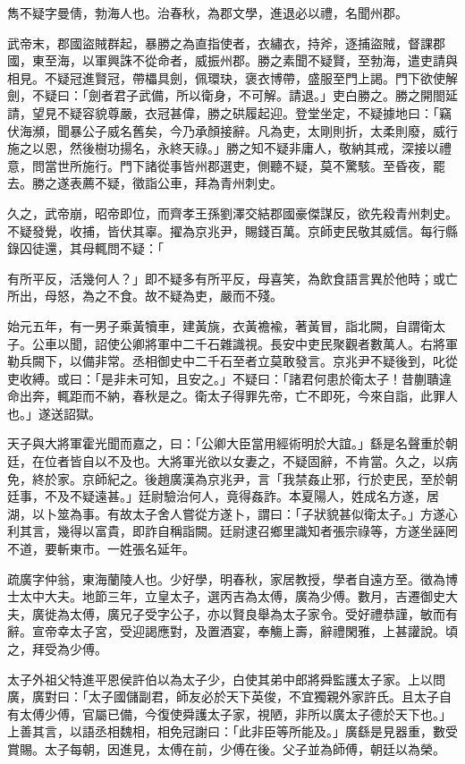 
\begin{pinyinscope}
雋不疑字曼倩，勃海人也。治春秋，為郡文學，進退必以禮，名聞州郡。

武帝末，郡國盜賊群起，暴勝之為直指使者，衣繡衣，持斧，逐捕盜賊，督課郡國，東至海，以軍興誅不從命者，威振州郡。勝之素聞不疑賢，至勃海，遣吏請與相見。不疑冠進賢冠，帶櫑具劍，佩環玦，褒衣博帶，盛服至門上謁。門下欲使解劍，不疑曰：「劍者君子武備，所以衛身，不可解。請退。」吏白勝之。勝之開閤延請，望見不疑容貌尊嚴，衣冠甚偉，勝之硔履起迎。登堂坐定，不疑據地曰：「竊伏海瀕，聞暴公子威名舊矣，今乃承顏接辭。凡為吏，太剛則折，太柔則廢，威行施之以恩，然後樹功揚名，永終天祿。」勝之知不疑非庸人，敬納其戒，深接以禮意，問當世所施行。門下諸從事皆州郡選吏，側聽不疑，莫不驚駭。至昏夜，罷去。勝之遂表薦不疑，徵詣公車，拜為青州刺史。

久之，武帝崩，昭帝即位，而齊孝王孫劉澤交結郡國豪傑謀反，欲先殺青州刺史。不疑發覺，收捕，皆伏其辜。擢為京兆尹，賜錢百萬。京師吏民敬其威信。每行縣錄囚徒還，其母輒問不疑：「

有所平反，活幾何人？」即不疑多有所平反，母喜笑，為飲食語言異於他時；或亡所出，母怒，為之不食。故不疑為吏，嚴而不殘。

始元五年，有一男子乘黃犢車，建黃旐，衣黃襜褕，著黃冒，詣北闕，自謂衛太子。公車以聞，詔使公卿將軍中二千石雜識視。長安中吏民聚觀者數萬人。右將軍勒兵闕下，以備非常。丞相御史中二千石至者立莫敢發言。京兆尹不疑後到，叱從吏收縛。或曰：「是非未可知，且安之。」不疑曰：「諸君何患於衛太子！昔蒯聵違命出奔，輒距而不納，春秋是之。衛太子得罪先帝，亡不即死，今來自詣，此罪人也。」遂送詔獄。

天子與大將軍霍光聞而嘉之，曰：「公卿大臣當用經術明於大誼。」繇是名聲重於朝廷，在位者皆自以不及也。大將軍光欲以女妻之，不疑固辭，不肯當。久之，以病免，終於家。京師紀之。後趙廣漢為京兆尹，言「我禁姦止邪，行於吏民，至於朝廷事，不及不疑遠甚。」廷尉驗治何人，竟得姦詐。本夏陽人，姓成名方遂，居湖，以卜筮為事。有故太子舍人嘗從方遂卜，謂曰：「子狀貌甚似衛太子。」方遂心利其言，幾得以富貴，即詐自稱詣闕。廷尉逮召鄉里識知者張宗祿等，方遂坐誣罔不道，要斬東巿。一姓張名延年。

疏廣字仲翁，東海蘭陵人也。少好學，明春秋，家居教授，學者自遠方至。徵為博士太中大夫。地節三年，立皇太子，選丙吉為太傅，廣為少傅。數月，吉遷御史大夫，廣徙為太傅，廣兄子受字公子，亦以賢良舉為太子家令。受好禮恭謹，敏而有辭。宣帝幸太子宮，受迎謁應對，及置酒宴，奉觴上壽，辭禮閑雅，上甚讙說。頃之，拜受為少傅。

太子外祖父特進平恩侯許伯以為太子少，白使其弟中郎將舜監護太子家。上以問廣，廣對曰：「太子國儲副君，師友必於天下英俊，不宜獨親外家許氏。且太子自有太傅少傅，官屬已備，今復使舜護太子家，視陋，非所以廣太子德於天下也。」上善其言，以語丞相魏相，相免冠謝曰：「此非臣等所能及。」廣繇是見器重，數受賞賜。太子每朝，因進見，太傅在前，少傅在後。父子並為師傅，朝廷以為榮。


\end{pinyinscope}
